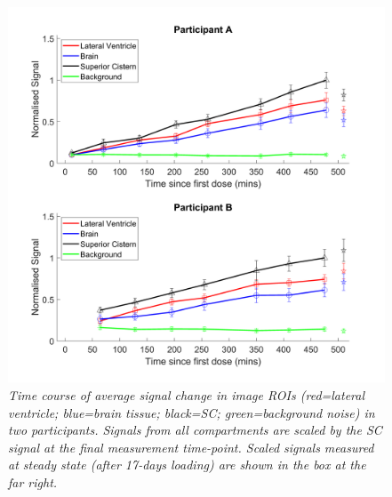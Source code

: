\begin{figure}[H]
    \centering
    \includegraphics[width=1\textwidth]{Figures/D2O/ROI_Graph.png}
    \caption{\textit{Time course of average signal change in image ROIs (red=lateral ventricle; blue=brain tissue; black=\ac{SC}; green=background noise) in two participants. Signals from all compartments are scaled by the \ac{SC} signal at the final measurement time-point. Scaled signals measured at steady state (after 17-days loading) are shown in the box at the far right.}}
    \label{fig:D2O:ROI_Graph}
\end{figure}


